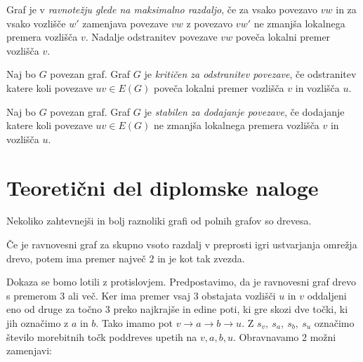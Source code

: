 \documentclass[fin1, tisk]{fmfdelo}
\begin{document}
\begin{definicija}
Graf je v \textit{ravnotežju glede na maksimalno razdaljo}, če za vsako povezavo $vw$
in za vsako vozlišče $w'$ zamenjava povezave $vw$ z povezavo $vw'$ ne zmanjša
lokalnega premera vozlišča $v$. Nadalje odstranitev povezave $vw$ poveča
lokalni premer vozlišča $v$.
\end{definicija}


\begin{definicija}
Naj bo $G$ povezan graf. Graf $G$ je \textit{kritičen za odstranitev povezave},
če odstranitev katere koli povezave $uv \in E(G)$ poveča lokalni premer vozlišča $v$ in vozlišča $u$.
\end{definicija}

\begin{definicija}
Naj bo $G$ povezan graf. Graf $G$ je \textit{stabilen za dodajanje povezave},
če dodajanje katere koli povezave $uv \in E(G)$ ne zmanjša lokalnega premera vozlišča $v$ in vozlišča $u$.
\end{definicija}


\section{Teoretični del diplomske naloge}

Nekoliko zahtevnejši in bolj raznoliki grafi od polnih grafov so drevesa.

\begin{izrek}
Če je ravnovesni graf za skupno vsoto razdalj v preprosti igri ustvarjanja
omrežja drevo, potem ima premer največ $2$ in je kot tak zvezda.
\end{izrek}

\begin{dokaz}
Dokaza se bomo lotili z protislovjem. Predpostavimo, da je ravnovesni graf
drevo s premerom 3 ali več. Ker ima premer vsaj 3 obstajata vozlišči
$u$ in $v$ oddaljeni eno od druge za točno 3 preko najkrajše in edine poti,
ki gre skozi dve točki, ki jih označimo z $a$ in $b$. Tako imamo pot
$v \to a \to b \to u$. Z $s_v,\ s_a,\ s_b,\ s_u$ označimo število morebitnih
točk poddreves upetih na $v, a, b, u$. Obravnavamo 2 možni zamenjavi: 
\end{dokaz}
\end{document}
